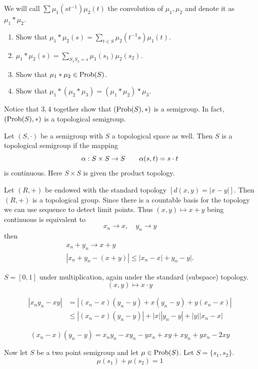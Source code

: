 We will call $\sum \mu_1(st^{-1}) \mu_2(t)$ the convolution of $\mu_1,\mu_2$ and denote it as $\mu_1 * \mu_2$.

\begin{enumerate}
\item[1)] Show that $\mu_1 * \mu_2(s) = \sum\limits_{t\in S}
     \mu_2(t^{-1}s) \mu_1(t)$.
\item[2)] $\mu_1 * \mu_2(s) = \sum\limits_{S_1S_2=s}
     \mu_1(s_1) \mu_2(s_2)$.
\item[3)] Show that $\mu_1 * \mu_2 \in \hbox{Prob}(S)$.
\item[4)] Show that $\mu_1 * (\mu_2 * \mu_3) = (\mu_1 * \mu_2)
     * \mu_3$.
\end{enumerate}

Notice that $3,4$ together show that $(\hbox{Prob}(S),*)$ is a semigroup.  
In fact, $(\hbox{Prob}(S),*)$ is a topological semigroup.

\begin{definition}   \label{defn:3.1}
Let $(S,\cdot)$ be a semigroup with $S$ a topological space as well.  
Then $S$ is a topological semigroup if the mapping
\[
     \alpha: S \times S \to S \qquad \alpha(s,t) = s \cdot t
\]
is continuous.  
Here $S \times S$ is given the product topology.
\end{definition}

\begin{example}	\label{exm:3.1}
  Let $(R,+)$ be endowed with the standard
topology $[d(x,y) = |x-y|]$.  Then $(R,+)$ is a topological group.
Since there is a countable basis for the topology we can use sequence
to detect limit points.  Thus $(x,y) \mapsto x+y$ being continuous is
equivalent to
\[
     x_n \to x, \quad y_n \to y
\]
then
\[
  \begin{gathered}
       x_n+y_n \to x+y     \\
       |x_n+y_n - (x+y)| \le |x_n-x| + y_n-y|.
  \end{gathered}
\]
\end{example}

\begin{example}	\label{exm:3.2}
$S = [0,1]$ under multiplication, again under
the standard (subspace) topology.
\[
     (x,y) \mapsto x \cdot y
\]

\[
\begin{aligned}
  |x_ny_n - xy| &= |(x_n-x)(y_n-y) + x(y_n-y) + y(x_n-x)| \\
  &\le |(x_n-x)(y_n-y)| + |x||y_n-y| + |y||x_n-x|
\end{aligned}
\]

\[
  (x_n-x)(y_n-y) = x_ny_n - xy_n - yx_n + xy + xy_n + yx_n - 2xy
\]

Now let $S$ be a two point semigroup and let $\mu \in \hbox{Prob}(S)$.
Let $S = \{ s_1,s_2 \}$.
\[
     \mu(s_1) + \mu(s_2) = 1
\]
\end{example}

